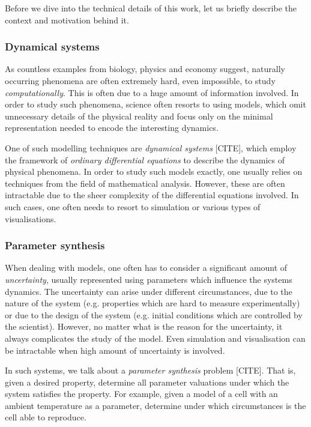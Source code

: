 Before we dive into the technical details of this work, let us briefly describe the context and motivation behind it.

\subsubsection{\textbf{Dynamical systems}}

As countless examples from biology, physics and economy suggest, naturally occurring phenomena are often extremely hard, even impossible, to study \emph{computationally}. This is often due to a huge amount of information involved. In order to study such phenomena, science often resorts to using models, which omit unnecessary details of the physical reality and focus only on the minimal representation needed to encode the interesting dynamics.

One of such modelling techniques are \emph{dynamical systems} [CITE], which employ the framework of \emph{ordinary differential equations} to describe the dynamics of physical phenomena. In order to study such models exactly, one usually relies on techniques from the field of mathematical analysis. However, these are often intractable due to the sheer complexity of the differential equations involved. In such cases, one often needs to resort to simulation or various types of visualisations.

\subsubsection{\textbf{Parameter synthesis}}

When dealing with models, one often has to consider a significant amount of \emph{uncertainty}, usually represented using parameters which influence the systems dynamics. The uncertainty can arise under different circumstances, due to the nature of the system (e.g. properties which are hard to measure experimentally) or due to the design of the system (e.g. initial conditions which are controlled by the scientist). However, no matter what is the reason for the uncertainty, it always complicates the study of the model. Even simulation and visualisation can be intractable when high amount of uncertainty is involved. 

In such systems, we talk about a \emph{parameter synthesis} problem [CITE]. That is, given a desired property, determine all parameter valuations under which the system satisfies the property. For example, given a model of a cell with an ambient temperature as a parameter, determine under which circumstances is the cell able to reproduce. 


